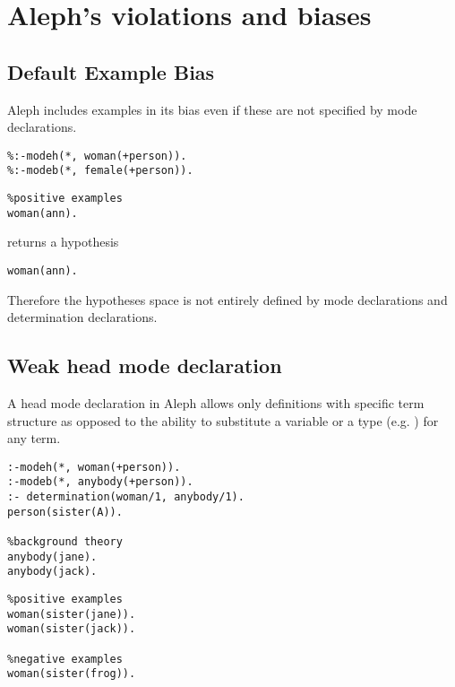 \section{Aleph's violations and biases}

\subsection{Default Example Bias}
Aleph includes examples in its bias even if these are not specified by mode declarations.

\begin{minipage}[t]{.50\textwidth}
\begin{lstlisting}
%:-modeh(*, woman(+person)).
%:-modeb(*, female(+person)).
\end{lstlisting}
\end{minipage}
\begin{minipage}[t]{.20\textwidth}
\begin{lstlisting}
%positive examples
woman(ann).
\end{lstlisting}
\end{minipage}

returns a hypothesis
\begin{lstlisting}
woman(ann).
\end{lstlisting}

Therefore the hypotheses space is not entirely defined by mode declarations and determination declarations.

\subsection{Weak head mode declaration}
A head mode declaration in Aleph allows only definitions with specific term structure as opposed to
the ability to substitute a variable or a type (e.g. ) for any term.

\begin{minipage}[t]{.55\textwidth}
\begin{lstlisting}
:-modeh(*, woman(+person)).
:-modeb(*, anybody(+person)).
:- determination(woman/1, anybody/1).
person(sister(A)).

%background theory
anybody(jane).
anybody(jack).
\end{lstlisting}
\end{minipage}
\begin{minipage}[t]{.30\textwidth}
\begin{lstlisting}
%positive examples
woman(sister(jane)).
woman(sister(jack)).

%negative examples
woman(sister(frog)).
\end{lstlisting}
\end{minipage}

